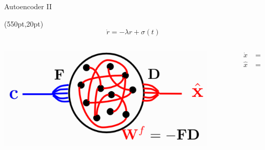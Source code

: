 \documentclass[17pt, t, lualatex]{beamer}
\begin{document}
\begin{frame}{Autoencoder II}
	\begin{textblock*}{10pt}(550pt,20pt)
		\small
		\begin{equation*}
		\dot{r} = -\lambda r + \sigma(t)
		\end{equation*}
	\end{textblock*}
	\begin{columns}[T]
		\begin{column}{0.48\textwidth}
			\begin{center}
				\includegraphics[width=0.9\textwidth,trim= 3cm 5cm 3cm 0cm]{figures/autoencoder2.png}
			\end{center}
		\end{column}

		\begin{column}{0.48\textwidth}
			\begin{equation}
			\begin{aligned}
			\dot{x} &= -\lambda x + c\\
			\hat{x} &= Dr
			\end{aligned}
			\end{equation}
		\end{column}
	\end{columns}

\end{frame}
\end{document}
